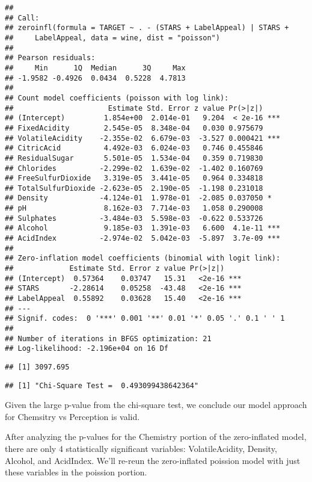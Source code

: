 \documentclass[]{article}
\begin{document}
\begin{verbatim}
## 
## Call:
## zeroinfl(formula = TARGET ~ . - (STARS + LabelAppeal) | STARS + 
##     LabelAppeal, data = wine, dist = "poisson")
## 
## Pearson residuals:
##     Min      1Q  Median      3Q     Max 
## -1.9582 -0.4926  0.0434  0.5228  4.7813 
## 
## Count model coefficients (poisson with log link):
##                      Estimate Std. Error z value Pr(>|z|)    
## (Intercept)         1.854e+00  2.014e-01   9.204  < 2e-16 ***
## FixedAcidity        2.545e-05  8.348e-04   0.030 0.975679    
## VolatileAcidity    -2.355e-02  6.679e-03  -3.527 0.000421 ***
## CitricAcid          4.492e-03  6.024e-03   0.746 0.455846    
## ResidualSugar       5.501e-05  1.534e-04   0.359 0.719830    
## Chlorides          -2.299e-02  1.639e-02  -1.402 0.160769    
## FreeSulfurDioxide   3.319e-05  3.441e-05   0.964 0.334818    
## TotalSulfurDioxide -2.623e-05  2.190e-05  -1.198 0.231018    
## Density            -4.124e-01  1.978e-01  -2.085 0.037050 *  
## pH                  8.162e-03  7.714e-03   1.058 0.290008    
## Sulphates          -3.484e-03  5.598e-03  -0.622 0.533726    
## Alcohol             9.185e-03  1.391e-03   6.600  4.1e-11 ***
## AcidIndex          -2.974e-02  5.042e-03  -5.897  3.7e-09 ***
## 
## Zero-inflation model coefficients (binomial with logit link):
##             Estimate Std. Error z value Pr(>|z|)    
## (Intercept)  0.57364    0.03747   15.31   <2e-16 ***
## STARS       -2.28614    0.05258  -43.48   <2e-16 ***
## LabelAppeal  0.55892    0.03628   15.40   <2e-16 ***
## ---
## Signif. codes:  0 '***' 0.001 '**' 0.01 '*' 0.05 '.' 0.1 ' ' 1 
## 
## Number of iterations in BFGS optimization: 21 
## Log-likelihood: -2.196e+04 on 16 Df
\end{verbatim}

\begin{verbatim}
## [1] 3097.695
\end{verbatim}

\begin{verbatim}
## [1] "Chi-Square Test =  0.493099438642364"
\end{verbatim}

Given the large p-value from the chi-square test, we conclude our model
approach for Chemsitry vs Perception is valid.

After analyzing the p-values for the Chemistry portion of the
zero-inflated model, there are only 4 statistically significant
variables: VolatileAcidity, Density, Alcohol, and AcidIndex. We'll
re-reun the zero-inflated poission model with just these variables in
the poission portion.
\end{document}

